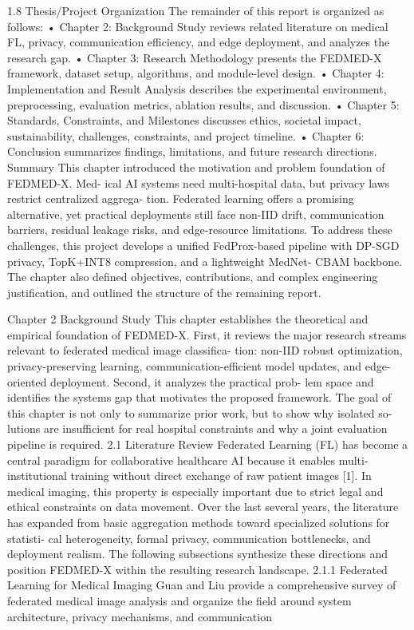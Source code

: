 1.8
Thesis/Project Organization
The remainder of this report is organized as follows:
• Chapter 2: Background Study reviews related literature on medical FL, privacy, communication efficiency, and edge deployment, and analyzes the research gap.
• Chapter 3: Research Methodology presents the FEDMED-X framework, dataset setup, algorithms, and module-level design.
• Chapter 4: Implementation and Result Analysis describes the experimental environment, preprocessing, evaluation metrics, ablation results, and discussion.
• Chapter 5: Standards, Constraints, and Milestones discusses ethics, societal impact, sustainability, challenges, constraints, and project timeline.
• Chapter 6:
Conclusion summarizes findings, limitations, and future research directions.
Summary
This chapter introduced the motivation and problem foundation of FEDMED-X. Med- ical AI systems need multi-hospital data, but privacy laws restrict centralized aggrega- tion. Federated learning offers a promising alternative, yet practical deployments still face non-IID drift, communication barriers, residual leakage risks, and edge-resource limitations. To address these challenges, this project develops a unified FedProx-based pipeline with DP-SGD privacy, TopK+INT8 compression, and a lightweight MedNet-
CBAM backbone.
The chapter also defined objectives, contributions, and complex engineering justification, and outlined the structure of the remaining report.

Chapter 2
Background Study
This chapter establishes the theoretical and empirical foundation of FEDMED-X. First, it reviews the major research streams relevant to federated medical image classifica- tion: non-IID robust optimization, privacy-preserving learning, communication-efficient model updates, and edge-oriented deployment. Second, it analyzes the practical prob- lem space and identifies the systems gap that motivates the proposed framework. The goal of this chapter is not only to summarize prior work, but to show why isolated so- lutions are insufficient for real hospital constraints and why a joint evaluation pipeline is required.
2.1
Literature Review
Federated Learning (FL) has become a central paradigm for collaborative healthcare AI because it enables multi-institutional training without direct exchange of raw patient images [1]. In medical imaging, this property is especially important due to strict legal and ethical constraints on data movement. Over the last several years, the literature has expanded from basic aggregation methods toward specialized solutions for statisti- cal heterogeneity, formal privacy, communication bottlenecks, and deployment realism.
The following subsections synthesize these directions and position FEDMED-X within the resulting research landscape.
2.1.1
Federated Learning for Medical Imaging
Guan and Liu provide a comprehensive survey of federated medical image analysis and organize the field around system architecture, privacy mechanisms, and communication

